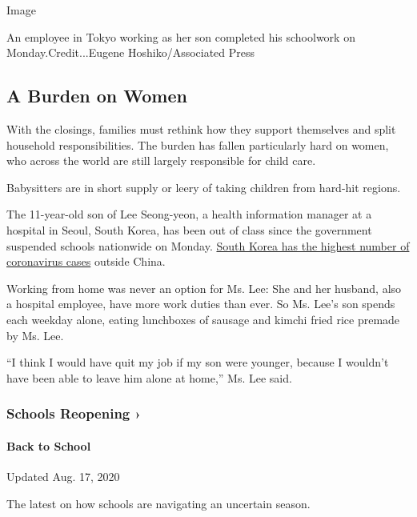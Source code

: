 Image

An employee in Tokyo working as her son completed his schoolwork on
Monday.Credit...Eugene Hoshiko/Associated Press

\hypertarget{a-burden-on-women}{%
\subsection{A Burden on Women}\label{a-burden-on-women}}

With the closings, families must rethink how they support themselves and
split household responsibilities. The burden has fallen particularly
hard on women, who across the world are still largely responsible for
child care.

Babysitters are in short supply or leery of taking children from
hard-hit regions.

The 11-year-old son of Lee Seong-yeon, a health information manager at a
hospital in Seoul, South Korea, has been out of class since the
government suspended schools nationwide on Monday.
\href{https://www.nytimes.com/2020/02/23/world/asia/south-korea-coronavirus-moon.html}{South
Korea has the highest number of coronavirus cases} outside China.

Working from home was never an option for Ms. Lee: She and her husband,
also a hospital employee, have more work duties than ever. So Ms. Lee's
son spends each weekday alone, eating lunchboxes of sausage and kimchi
fried rice premade by Ms. Lee.

``I think I would have quit my job if my son were younger, because I
wouldn't have been able to leave him alone at home,'' Ms. Lee said.

\href{https://www.nytimes.com/spotlight/schools-reopening?action=click\&pgtype=Article\&state=default\&region=MAIN_CONTENT_3\&context=storylines_keepup}{}

\hypertarget{schools-reopening-}{%
\subsubsection{Schools Reopening ›}\label{schools-reopening-}}

\hypertarget{back-to-school}{%
\paragraph{Back to School}\label{back-to-school}}

Updated Aug. 17, 2020

The latest on how schools are navigating an uncertain season.

